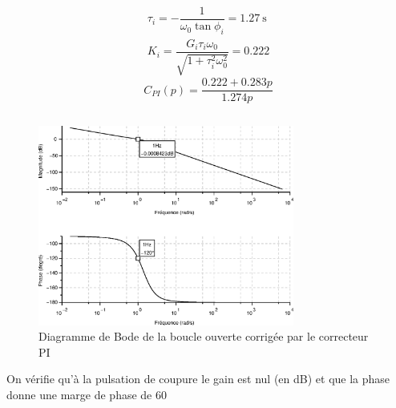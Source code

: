 \begin{align*}
    \tau_i=-\dfrac{1}{\omega_0\tan\phi_i}=\SI{1.27}{\second}\\
    K_i=\dfrac{G_i\tau_i\omega_0}{\sqrt{1+\tau^2_i\omega^2_0}}=0.222
\end{align*}
\[
    C_{PI}(p)=\dfrac{0.222 + 0.283p}{1.274p}
\]
\inputminted{scilab}{scilab/code_q13_chap_correction.sce}
\begin{figure}
    \centering
    \includegraphics[width=0.75\textwidth]{fig/chap_correction/bode_BOCPI.eps}
    \caption{Diagramme de Bode de la boucle ouverte corrigée par 
    le correcteur PI}
\end{figure}
On vérifie qu'à la pulsation de coupure le gain est nul (en \si{\dB}) et
que la phase donne une marge de phase de \SI{60}{\degreeSI}
